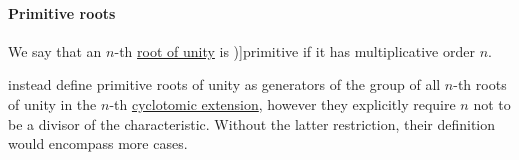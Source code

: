 \paragraph{Primitive roots}

\begin{definition}\label{def:primitive_root_of_unity}
  We say that an \( n \)-th \hyperref[def:root_of_unity]{root of unity} is \term[ru=первообразный (корень единицы) (\cite[90]{Тыртышников2017ОсновыАлгебры})]{primitive} if it has multiplicative order \( n \).
\end{definition}
\begin{comments}
  \item {} instead define primitive roots of unity as generators of the group of all \( n \)-th roots of unity in the \( n \)-th \hyperref[def:cyclotomic_extension]{cyclotomic extension}, however they explicitly require \( n \) not to be a divisor of the characteristic. Without the latter restriction, their definition would encompass more cases.
\end{comments}

